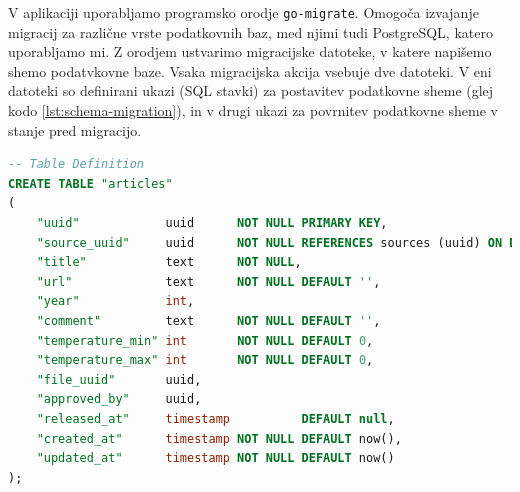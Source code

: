 \documentclass[a4paper, 12pt]{book}
\begin{document}
V aplikaciji uporabljamo programsko orodje \verb=go-migrate=. Omogoča izvajanje migracij za različne vrste podatkovnih baz, med njimi tudi PostgreSQL, katero uporabljamo mi. Z orodjem ustvarimo migracijske datoteke, v katere napišemo shemo podatvkovne baze. Vsaka migracijska akcija vsebuje dve datoteki. V eni datoteki so definirani ukazi (SQL stavki) za postavitev podatkovne sheme (glej kodo \ref{lst:schema-migration}), in v drugi ukazi za  povrnitev podatkovne sheme v stanje pred migracijo.


\begin{lstlisting}[language=sql, style=mystyle,caption={Izsek koda, za kreiranje tabele "articles", namenjeno hranjenju podatkov o publikacijah.},label=lst:schema-migration]
-- Table Definition
CREATE TABLE "articles"
(
    "uuid"            uuid      NOT NULL PRIMARY KEY,
    "source_uuid"     uuid      NOT NULL REFERENCES sources (uuid) ON DELETE CASCADE,
    "title"           text      NOT NULL,
    "url"             text      NOT NULL DEFAULT '',
    "year"            int,
    "comment"         text      NOT NULL DEFAULT '',
    "temperature_min" int       NOT NULL DEFAULT 0,
    "temperature_max" int       NOT NULL DEFAULT 0,
    "file_uuid"       uuid,
    "approved_by"     uuid,
    "released_at"     timestamp          DEFAULT null,
    "created_at"      timestamp NOT NULL DEFAULT now(),
    "updated_at"      timestamp NOT NULL DEFAULT now()
);
\end{lstlisting}
\end{document}
